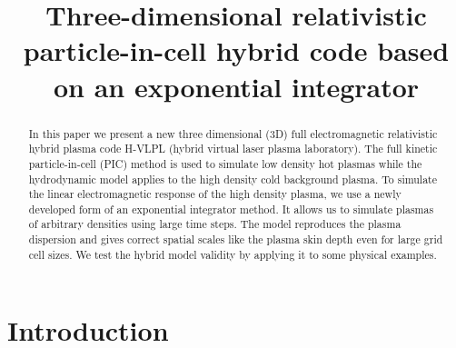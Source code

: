 \documentclass[conference]{IEEEtran}
\renewcommand{\~}{\widetilde }
\begin{document}
\title{Three-dimensional relativistic particle-in-cell hybrid code
based on an exponential integrator}

\author{
	\IEEEauthorblockA{ Institut f{\"u}r Theoretische Physik I \\
	Heinrich-Heine Universit{\"a}t D{\"u}sseldorf \\ 40225, D{\"u}sseldorf, Germany \\
	}
	\and
}
\maketitle

\begin{abstract}
In this paper we present a new three dimensional (3D) full electromagnetic
relativistic hybrid plasma code  H-VLPL (hybrid virtual laser plasma
laboratory). The full kinetic particle-in-cell 
(PIC) method is used to simulate low density hot plasmas while
the hydrodynamic model applies to the high density cold background plasma.
To simulate the linear electromagnetic response of the high density
plasma, we use a newly developed form of an exponential integrator
method. It allows us  to simulate plasmas of arbitrary
densities using large time steps.
The model reproduces the  plasma dispersion and gives correct spatial
scales like the plasma skin depth even for large grid cell sizes. We
test the hybrid model validity by 
applying it to some physical examples. 
\end{abstract}


\section{Introduction}
\end{document}
